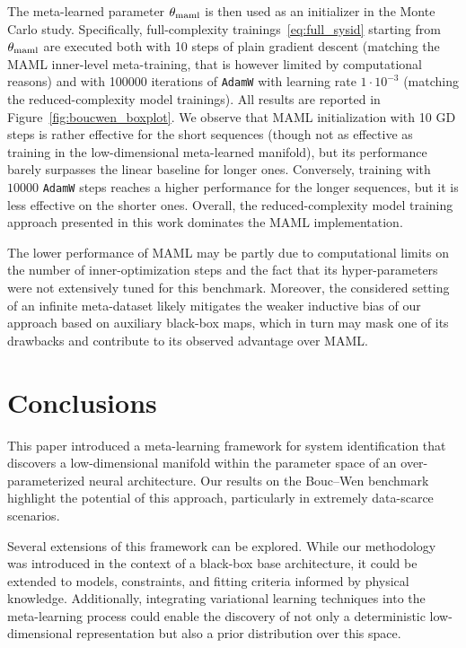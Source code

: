 \documentclass{article}
\newcommand{\fullpar}{\theta}
\begin{document}
The meta-learned parameter $\fullpar_{\rm maml}$ is then used as an initializer in the Monte Carlo study. Specifically, full-complexity trainings~\eqref{eq:full_sysid} starting from $\fullpar_{\rm maml}$ are executed both
with 10 steps of plain gradient descent (matching the MAML inner-level meta-training, that is however limited by computational reasons) and with 100000 iterations of \texttt{AdamW} with learning rate $1 \cdot 10^{-3}$ (matching the reduced-complexity  model trainings). All results are reported in Figure~\ref{fig:boucwen_boxplot}. We observe that MAML initialization with 10 GD steps is rather effective for the short sequences (though not as effective as training in the low-dimensional meta-learned manifold), but its performance barely surpasses the linear baseline for longer ones. Conversely, training
with $10000$ \texttt{AdamW} steps reaches a higher performance for the longer sequences, but it is less effective on the shorter ones. Overall, the reduced-complexity model training approach presented in this work dominates the MAML implementation.

The lower performance of MAML may be partly due to computational limits on the number of inner-optimization steps and the fact that its hyper-parameters were not extensively tuned for this benchmark. Moreover, the considered setting of an infinite meta-dataset likely mitigates the weaker inductive bias of our approach based on auxiliary black-box maps, which in turn may mask one of its drawbacks and contribute to its observed advantage over MAML.

\section{Conclusions}
\label{sec:conclusions}
This paper introduced a meta-learning framework for system identification that discovers a low-dimensional manifold within the parameter space of an over-parameterized neural architecture. Our results on the Bouc--Wen benchmark highlight the potential of this approach, particularly in extremely data-scarce scenarios.

Several extensions of this framework can be explored. While our methodology was introduced in the context of a black-box base architecture, it could be extended to models, constraints, and fitting criteria informed by physical knowledge.  Additionally, integrating variational learning techniques into the meta-learning process could enable the discovery of not only a deterministic low-dimensional representation but also a prior distribution over this space.
\end{document}
